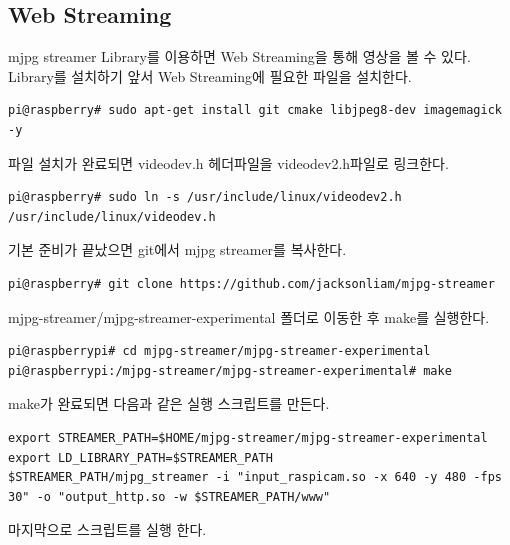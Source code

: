 \documentclass[11pt
  , a4paper
  , article
  , oneside
]{memoir}
\begin{document}
\subsection{Web Streaming}
mjpg streamer Library를 이용하면 Web Streaming을 통해 영상을 볼 수 있다. Library를 설치하기 앞서
Web Streaming에 필요한 파일을 설치한다.
\begin{lstlisting}[style=termstyle]
pi@raspberry# sudo apt-get install git cmake libjpeg8-dev imagemagick -y
\end{lstlisting}
파일 설치가 완료되면 videodev.h 헤더파일을 videodev2.h파일로 링크한다.
\begin{lstlisting}[style=termstyle]
pi@raspberry# sudo ln -s /usr/include/linux/videodev2.h /usr/include/linux/videodev.h
\end{lstlisting}
기본 준비가 끝났으면 git에서 mjpg streamer를 복사한다.
\begin{lstlisting}[style=termstyle]
pi@raspberry# git clone https://github.com/jacksonliam/mjpg-streamer
\end{lstlisting}
mjpg-streamer/mjpg-streamer-experimental 폴더로 이동한 후 make를 실행한다.
\begin{lstlisting}[style=termstyle]
pi@raspberrypi# cd mjpg-streamer/mjpg-streamer-experimental
pi@raspberrypi:/mjpg-streamer/mjpg-streamer-experimental# make
\end{lstlisting}
make가 완료되면 다음과 같은 실행 스크립트를 만든다.
\begin{lstlisting}[style=termstyle]
export STREAMER_PATH=$HOME/mjpg-streamer/mjpg-streamer-experimental
export LD_LIBRARY_PATH=$STREAMER_PATH
$STREAMER_PATH/mjpg_streamer -i "input_raspicam.so -x 640 -y 480 -fps 30" -o "output_http.so -w $STREAMER_PATH/www"
\end{lstlisting}
마지막으로 스크립트를 실행 한다.
\end{document}
